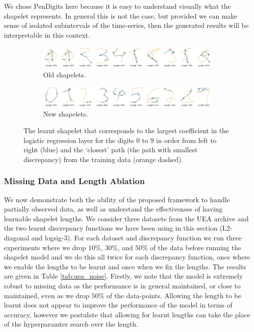 We chose PenDigits here because it is easy to understand visually what the shapelet represents. In general this is not the case, but provided we can make sense of isolated subintervals of the time-series, then the generated results will be interpretable in this context.
\begin{figure}[ht]
    \begin{subfigure}[b]{\linewidth}
        \centering
        \includegraphics[width=\linewidth]{images/pendigits/old_shapelets_noborder.png}
        \caption{Old shapelets.}
        \label{fig:old_shapelets}
    \end{subfigure}
    \begin{subfigure}[b]{\linewidth}
        \centering
        \includegraphics[width=\linewidth]{images/pendigits/new_shapelets_noborder.png}
        \caption{New shapelets.}
        \label{fig:new_shapelets}
    \end{subfigure}
    \caption{The learnt shapelet that corresponds to the largest coefficient in the logistic regression layer for the digits 0 to 9 in order from left to right (blue) and the `closest' path (the path with smallest discrepancy) from the training data (orange dashed).}
    \label{fig:pendigits}
\end{figure}


\subsubsection{Missing Data and Length Ablation}
We now demonstrate both the ability of the proposed framework to handle partially observed data, as well as understand the effectiveness of having learnable shapelet lengths. We consider three datasets from the UEA archive and the two learnt discrepancy functions we have been using in this section (L2-diagonal and logsig-3). For each dataset and discrepancy function we run three experiments where we drop $10\%$, $30\%$, and $50\%$ of the data before running the shapelet model and we do this all twice for each discrepancy function, once where we enable the lengths to be learnt and once when we fix the lengths. The results are given in Table \ref{tab:uea_noise}. Firstly, we note that the model is extremely robust to missing data as the performance is in general maintained, or close to maintained, even as we drop $50\%$ of the data-points. Allowing the length to be learnt does not appear to improve the performance of the model in terms of accuracy, however we postulate that allowing for learnt lengths can take the place of the hyperparamter search over the length.
\begin{table}[ht]
    \caption{}
    \label{tab:uea_noise}
    \centering
    
\end{table}


